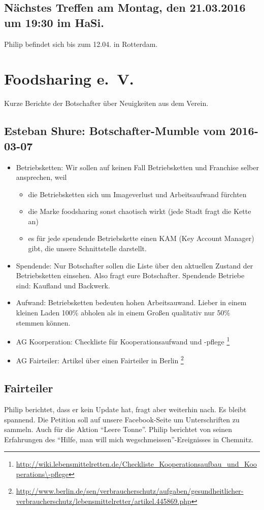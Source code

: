 \documentclass{scrreprt}
\begin{document}
\section{Nächstes Treffen am Montag, den 21.03.2016 um 19:30 im HaSi.}
    Philip befindet sich bis zum 12.04. in Rotterdam.

\chapter{Foodsharing e.~V.}
Kurze Berichte der Botschafter über Neuigkeiten aus dem Verein.\par

\section{Esteban Shure: Botschafter-Mumble vom 2016-03-07}
\begin{itemize}
	\item Betriebsketten: Wir sollen auf keinen Fall Betriebsketten und Franchise selber ansprechen, weil
	\begin{itemize}
		\item die Betriebsketten sich um Imageverlust und Arbeitsaufwand fürchten
		\item die Marke foodsharing sonst chaotisch wirkt (jede Stadt fragt die Kette an)
		\item es für jede spendende Betriebskette einen KAM (Key Account Manager) gibt, die unsere Schnittstelle darstellt.
	\end{itemize}
	\item Spendende: Nur Botschafter sollen die Liste über den aktuellen Zustand der Betriebsketten einsehen. Also fragt eure Botschafter. Spendende Betriebe sind: Kaufland und Backwerk. 
	\item Aufwand: Betriebsketten bedeuten hohen Arbeitsauwand. Lieber in einem kleinen Laden 100\% abholen als in einem Großen qualitativ nur 50\% stemmen können.
	\item AG Koorperation: Checkliste für Kooperationsaufwand und -pflege \footnote{\url{http://wiki.lebensmittelretten.de/Checkliste_Kooperationsaufbau_und_Kooperations\-pflege}}
	\item AG Fairteiler: Artikel über einen Fairteiler in Berlin \footnote{\url{http://www.berlin.de/sen/verbraucherschutz/aufgaben/gesundheitlicher-verbraucherschutz/lebensmittelretter/artikel.445869.php}}
\end{itemize}
	\section{Fairteiler}
	Philip berichtet, dass er kein Update hat, fragt aber weiterhin nach.     Es bleibt spannend. Die Petition soll auf unsere Facebook-Seite um Unterschriften zu sammeln. Auch für die Aktion \enquote{Leere Tonne}.
    Philip berichtet von seinen Erfahrungen des \enquote{Hilfe, man will mich wegschmeissen}-Ereignisses in Chemnitz.
\end{document}
